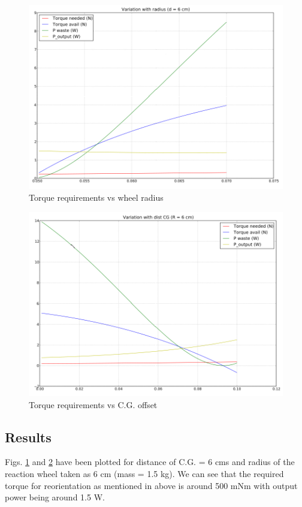 \begin{figure}[!h]
\centering
\includegraphics[scale=1.4]{fig/rewac_radius.pdf}
\caption{Torque requirements vs wheel radius}
\label{fig:4_rewac_radius}
\end{figure}
\begin{figure}[!h]
\centering
\includegraphics[scale=1.4]{fig/rewac_dist.pdf}
\caption{Torque requirements vs C.G. offset}
\label{fig:4_rewac_dist}
\end{figure}

\subsection*{Results}
Figs. \ref{fig:4_rewac_radius} and \ref{fig:4_rewac_dist} have been plotted for distance of C.G. = 6 cms and
radius of the reaction wheel taken as 6 cm (mass = 1.5 kg). We can see that the required torque for reorientation as mentioned in above is around 500 mNm with output power being around 1.5 W.

